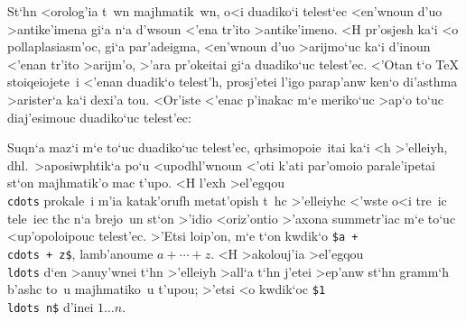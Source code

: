 St`hn <orolog'ia t~wn majhmatik~wn, o<i duadiko`i telest`ec <en'wnoun
d'uo >antike'imena gi`a n`a d'wsoun <'ena tr'ito >antike'imeno.  <H
pr'osjesh ka`i <o pollaplasiasm'oc, gi`a par'adeigma, <en'wnoun d'uo
>arijmo`uc ka`i d'inoun <'enan tr'ito >arijm'o, >'ara pr'okeitai gi`a
duadiko`uc telest'ec. <'Otan t`o {\rm \TeX} stoiqeiojete~i <'enan
duadik`o telest'h, prosj'etei l'igo parap'anw ken`o di'asthma >arister`a
ka`i dexi'a tou.  <Or'iste <'enac p'inakac m`e meriko`uc >ap`o to`uc
diaj'esimouc duadiko`uc telest'ec:%

\halign{
\strut \hfil$#$ & \quad \tt# \hfil \qquad &\hfil$#$ & \quad \tt# \hfil \qquad
      &\hfil$#$ & \quad \tt# \hfil \qquad &\hfil$#$ & \quad \tt# \hfil \cr
\noalign{\hrule} \noalign{\smallskip}
\cdot & \\cdot &\times & \\times &\ast & \\ast &\star & \\star \cr
\circ & \\circ & \bullet & \\bullet & \div & \\div & \diamond & \\diamond \cr
\cap & \\cap & \cup & \\cup & \vee & \\vee & \wedge & \\wedge \cr
\oplus & \\oplus &\ominus & \\ominus & \otimes &\\otimes &\odot &\\odot \cr
       }


Suqn`a maz`i m`e to`uc duadiko`uc telest'ec, qrhsimopoie~itai ka`i <h
>'elleiyh, dhl.\ >aposiwphtik`a po`u <upodhl'wnoun <'oti k'ati par'omoio
parale'ipetai st`on majhmatik'o mac t'upo. <H l'exh >el'egqou {\tt
\\cdots} prokale~i m'ia katak'orufh metat'opish t~hc >'elleiyhc <'wste
o<i tre~ic tele~iec thc n`a brejo~un st`on >'idio <oriz'ontio >'axona
summetr'iac m`e to`uc <up'opoloipouc telest'ec. >'Etsi loip'on, m`e t`on
kwdik`o {\tt \$a + \\cdots + z\$}, lamb'anoume $a + \cdots + z$.  <H
>akolouj'ia >el'egqou {\tt \\ldots} d`en >anuy'wnei t`hn >'elleiyh
>all`a t`hn j'etei >ep'anw st`hn gramm`h b'ashc to~u majhmatiko~u
t'upou; >'etsi <o kwdik`oc {\tt \$1\\ldots n\$} d'inei $1\ldots n$.

